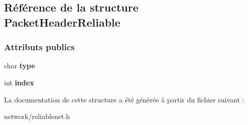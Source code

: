 \hypertarget{struct_packet_header_reliable}{}\subsection{Référence de la structure Packet\+Header\+Reliable}
\label{struct_packet_header_reliable}
\subsubsection*{Attributs publics}
\begin{DoxyCompactItemize}
\item 
\hypertarget{struct_packet_header_reliable_a7c081e58827351eead4e56769663f272}{}\label{struct_packet_header_reliable_a7c081e58827351eead4e56769663f272} 
char {\bfseries type}
\item 
\hypertarget{struct_packet_header_reliable_aff86075c352c7aa244f303a8e373b761}{}\label{struct_packet_header_reliable_aff86075c352c7aa244f303a8e373b761} 
int {\bfseries index}
\end{DoxyCompactItemize}


La documentation de cette structure a été générée à partir du fichier suivant \+:\begin{DoxyCompactItemize}
\item 
network/reliablenet.\+h\end{DoxyCompactItemize}
